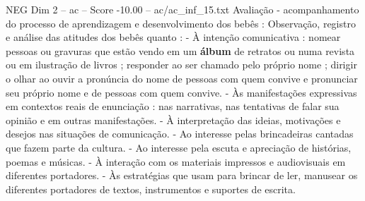 \begin{textsample}{NEG Dim 2 – ac – Score -10.00 – ac/ac\_inf\_15.txt}
Avaliação - acompanhamento do processo de aprendizagem e desenvolvimento dos bebês : Observação, registro e análise das atitudes dos bebês quanto : - À intenção comunicativa : nomear pessoas ou gravuras que estão vendo em um \textbf{álbum} de retratos ou numa revista ou em ilustração de livros ; responder ao ser chamado pelo próprio nome ; dirigir o olhar ao ouvir a pronúncia do nome de pessoas com quem convive e pronunciar seu próprio nome e de pessoas com quem convive. - Às manifestações expressivas em contextos reais de enunciação : nas narrativas, nas tentativas de falar sua opinião e em outras manifestações. - À interpretação das ideias, motivações e desejos nas situações de comunicação. - Ao interesse pelas brincadeiras cantadas que fazem parte da cultura. - Ao interesse pela escuta e apreciação de histórias, poemas e músicas. - À interação com os materiais impressos e audiovisuais em diferentes portadores. - Às estratégias que usam para brincar de ler, manusear os diferentes portadores de textos, instrumentos e suportes de escrita.

\end{textsample}
